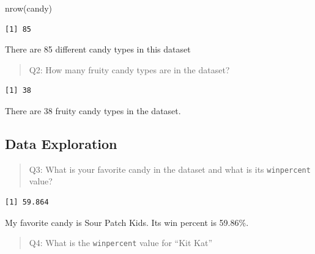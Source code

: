 \documentclass[
  letterpaper,
  DIV=11,
  numbers=noendperiod]{scrartcl}
\newenvironment{Shaded}{\begin{snugshade}}{\end{snugshade}}
\newcommand{\FunctionTok}[1]{\textcolor[rgb]{0.28,0.35,0.67}{#1}}
\newcommand{\NormalTok}[1]{\textcolor[rgb]{0.00,0.23,0.31}{#1}}
\newcommand{\SpecialCharTok}[1]{\textcolor[rgb]{0.37,0.37,0.37}{#1}}
\newcommand{\StringTok}[1]{\textcolor[rgb]{0.13,0.47,0.30}{#1}}
\begin{document}
\begin{Shaded}
\begin{Highlighting}[]
\FunctionTok{nrow}\NormalTok{(candy)}
\end{Highlighting}
\end{Shaded}

\begin{verbatim}
[1] 85
\end{verbatim}

There are 85 different candy types in this dataset

\begin{quote}
Q2: How many fruity candy types are in the dataset?
\end{quote}

\begin{Shaded}
\end{Shaded}

\begin{verbatim}
[1] 38
\end{verbatim}

There are 38 fruity candy types in the dataset.

\hypertarget{data-exploration}{%
\subsection{Data Exploration}\label{data-exploration}}

\begin{quote}
Q3: What is your favorite candy in the dataset and what is its
\texttt{winpercent} value?
\end{quote}

\begin{Shaded}
\end{Shaded}

\begin{verbatim}
[1] 59.864
\end{verbatim}

My favorite candy is Sour Patch Kids. Its win percent is 59.86\%.

\begin{quote}
Q4: What is the \texttt{winpercent} value for ``Kit Kat''
\end{quote}
\end{document}
